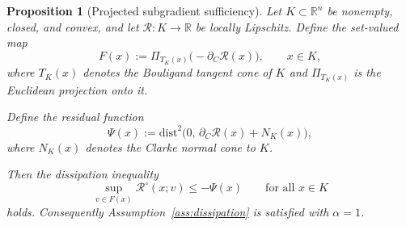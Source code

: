 \documentclass[12pt]{article}
\theoremstyle{plain}
\newtheorem{proposition}[theorem]{Proposition}
\theoremstyle{definition}
\theoremstyle{remark}
\begin{document}
\begin{proposition}[Projected subgradient sufficiency]
\label{prop:dissipation_sufficient}
Let $K\subset\mathbb{R}^n$ be nonempty, closed, and convex, and let
$\mathcal R:K\to\mathbb{R}$ be locally Lipschitz.
Define the set-valued map
\begin{equation}
F(x)
:=
\Pi_{T_K(x)}\!\big(-\partial_C \mathcal R(x)\big),
\qquad x\in K,
\label{eq:projected_subgradient}
\end{equation}
where $T_K(x)$ denotes the Bouligand tangent cone of $K$ and
$\Pi_{T_K(x)}$ is the Euclidean projection onto it.

Define the residual function
\begin{equation}
\Psi(x)
:=
\mathrm{dist}^2\!\big(
0,\,
\partial_C \mathcal R(x)+N_K(x)
\big),
\label{eq:KKT_residual}
\end{equation}
where $N_K(x)$ denotes the Clarke normal cone to $K$.

Then the dissipation inequality
\begin{equation}
\sup_{v\in F(x)}
\mathcal R^\circ(x;v)
\le
-\Psi(x)
\qquad \text{for all } x\in K
\label{eq:dissipation_result}
\end{equation}
holds.
Consequently Assumption~\ref{ass:dissipation}
is satisfied with $\alpha=1$.
\end{proposition}
\end{document}
